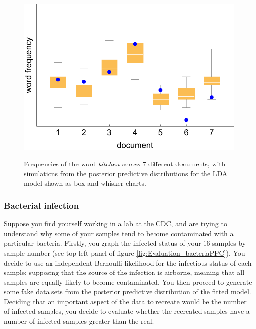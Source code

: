 \documentclass[11pt,fullpage]{book}
\begin{document}
\begin{figure}
\centering
\scalebox{0.8} 
{\includegraphics{Evaluation_wordPPC.pdf}}
\caption{Frequencies of the word \textit{kitchen} across 7 different documents, with simulations from the posterior predictive distributions for the LDA model shown as box and whisker charts.}\label{fig:Evaluation_wordPPC}
\end{figure} 

\subsubsection{Bacterial infection}
Suppose you find yourself working in a lab at the CDC, and are trying to understand why some of your samples tend to become contaminated with a particular bacteria. Firstly, you graph the infected status of your 16 samples by sample number (see top left panel of figure \ref{fig:Evaluation_bacteriaPPC}). You decide to use an independent Bernoulli likelihood for the infectious status of each sample; supposing that the source of the infection is airborne, meaning that all samples are equally likely to become contaminated. You then proceed to generate some fake data sets from the posterior predictive distribution of the fitted model. Deciding that an important aspect of the data to recreate would be the number of infected samples, you decide to evaluate whether the recreated samples have a number of infected samples greater than the real.
\end{document}
